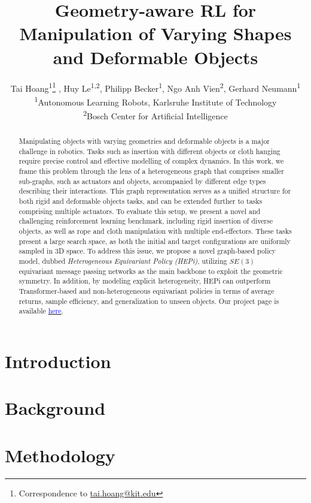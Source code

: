 \documentclass{article} %
\title{Geometry-aware RL for Manipulation of Varying Shapes and Deformable Objects}
\author{%
    Tai Hoang\textsuperscript{1}\thanks{Correspondence to \href{mailto:tai.hoang@kit.edu}{tai.hoang@kit.edu}} \space, \space
    Huy Le\textsuperscript{1,2}, \space
    Philipp Becker\textsuperscript{1}, \space 
    Ngo Anh Vien\textsuperscript{2}, \space
    Gerhard Neumann\textsuperscript{1} \\
    \textsuperscript{1}Autonomous Learning Robots, Karlsruhe Institute of Technology \\
    \textsuperscript{2}Bosch Center for Artificial Intelligence \\
}
\begin{document}
\maketitle

\begin{abstract}
    Manipulating objects with varying geometries and deformable objects is a major challenge in robotics. Tasks such as insertion with different objects or cloth hanging require precise control and effective modelling of complex dynamics. In this work, we frame this problem through the lens of a heterogeneous graph that comprises smaller sub-graphs, such as actuators and objects, accompanied by different edge types describing their interactions. This graph representation serves as a unified structure for both rigid and deformable objects tasks, and can be extended further to tasks comprising multiple actuators. To evaluate this setup, we present a novel and challenging reinforcement learning benchmark, including rigid insertion of diverse objects, as well as rope and cloth manipulation with multiple end-effectors. These tasks present a large search space, as both the initial and target configurations are uniformly sampled in 3D space. To address this issue, we propose a novel graph-based policy model, dubbed \emph{Heterogeneous Equivariant Policy (HEPi)}, utilizing $SE(3)$ equivariant message passing networks as the main backbone to exploit the geometric symmetry. In addition, by modeling explicit heterogeneity, HEPi can outperform Transformer-based and non-heterogeneous equivariant policies in terms of average returns, sample efficiency, and generalization to unseen objects. Our project page is available \href{https://thobotics.github.io/hepi}{\textcolor{blue}{here}}.
\end{abstract}

\section{Introduction}


\section{Background}


\section{Methodology}

\end{document}
